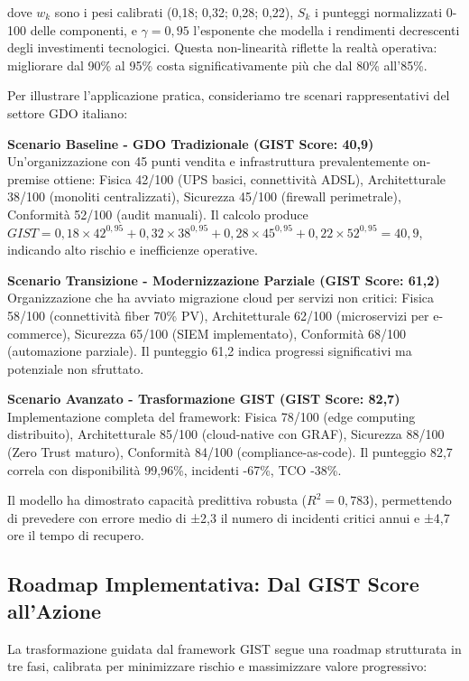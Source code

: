 dove $w_k$ sono i pesi calibrati (0,18; 0,32; 0,28; 0,22), $S_k$ i punteggi normalizzati 0-100 delle componenti, e $\gamma = 0,95$ l'esponente che modella i rendimenti decrescenti degli investimenti tecnologici. Questa non-linearità riflette la realtà operativa: migliorare dal 90\% al 95\% costa significativamente più che dal 80\% all'85\%.

Per illustrare l'applicazione pratica, consideriamo tre scenari rappresentativi del settore GDO italiano:

\textbf{Scenario Baseline - GDO Tradizionale (GIST Score: 40,9)}
Un'organizzazione con 45 punti vendita e infrastruttura prevalentemente on-premise ottiene: Fisica 42/100 (UPS basici, connettività ADSL), Architetturale 38/100 (monoliti centralizzati), Sicurezza 45/100 (firewall perimetrale), Conformità 52/100 (audit manuali). Il calcolo produce $GIST = 0,18 \times 42^{0,95} + 0,32 \times 38^{0,95} + 0,28 \times 45^{0,95} + 0,22 \times 52^{0,95} = 40,9$, indicando alto rischio e inefficienze operative.

\textbf{Scenario Transizione - Modernizzazione Parziale (GIST Score: 61,2)}
Organizzazione che ha avviato migrazione cloud per servizi non critici: Fisica 58/100 (connettività fiber 70\% PV), Architetturale 62/100 (microservizi per e-commerce), Sicurezza 65/100 (SIEM implementato), Conformità 68/100 (automazione parziale). Il punteggio 61,2 indica progressi significativi ma potenziale non sfruttato.

\textbf{Scenario Avanzato - Trasformazione GIST (GIST Score: 82,7)}
Implementazione completa del framework: Fisica 78/100 (edge computing distribuito), Architetturale 85/100 (cloud-native con GRAF), Sicurezza 88/100 (Zero Trust maturo), Conformità 84/100 (compliance-as-code). Il punteggio 82,7 correla con disponibilità 99,96\%, incidenti -67\%, TCO -38\%.

Il modello ha dimostrato capacità predittiva robusta ($R^2 = 0,783$), permettendo di prevedere con errore medio di ±2,3 il numero di incidenti critici annui e ±4,7 ore il tempo di recupero.

\subsection{\texorpdfstring{Roadmap Implementativa: Dal GIST Score all'Azione}{5.3.3 - Roadmap Implementativa: Dal GIST Score all'Azione}}
\label{subsec:5.3.3}

La trasformazione guidata dal framework GIST segue una roadmap strutturata in tre fasi, calibrata per minimizzare rischio e massimizzare valore progressivo:

